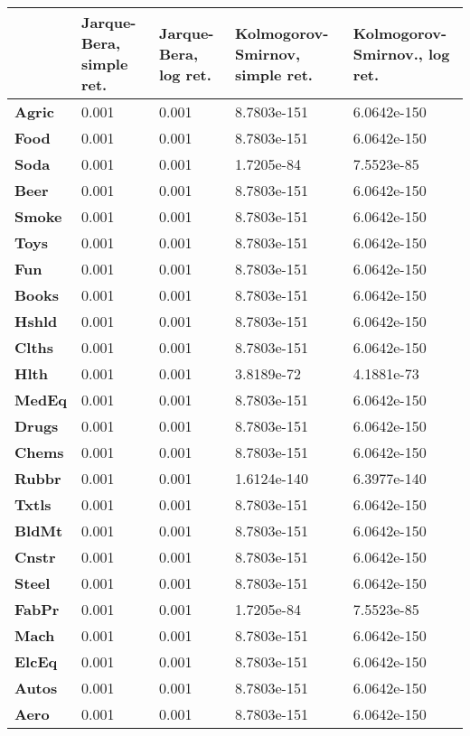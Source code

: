 \begin{tabular}{|l|l|l|l|l|}
\hline
&\textbf{Jarque-Bera, simple ret.}&\textbf{Jarque-Bera, log ret.}&\textbf{Kolmogorov-Smirnov, simple ret.}&\textbf{Kolmogorov-Smirnov., log ret.}\\\hline
\textbf{Agric}&0.001&0.001&8.7803e-151&6.0642e-150\\\hline
\textbf{Food}&0.001&0.001&8.7803e-151&6.0642e-150\\\hline
\textbf{Soda}&0.001&0.001&1.7205e-84&7.5523e-85\\\hline
\textbf{Beer}&0.001&0.001&8.7803e-151&6.0642e-150\\\hline
\textbf{Smoke}&0.001&0.001&8.7803e-151&6.0642e-150\\\hline
\textbf{Toys}&0.001&0.001&8.7803e-151&6.0642e-150\\\hline
\textbf{Fun}&0.001&0.001&8.7803e-151&6.0642e-150\\\hline
\textbf{Books}&0.001&0.001&8.7803e-151&6.0642e-150\\\hline
\textbf{Hshld}&0.001&0.001&8.7803e-151&6.0642e-150\\\hline
\textbf{Clths}&0.001&0.001&8.7803e-151&6.0642e-150\\\hline
\textbf{Hlth}&0.001&0.001&3.8189e-72&4.1881e-73\\\hline
\textbf{MedEq}&0.001&0.001&8.7803e-151&6.0642e-150\\\hline
\textbf{Drugs}&0.001&0.001&8.7803e-151&6.0642e-150\\\hline
\textbf{Chems}&0.001&0.001&8.7803e-151&6.0642e-150\\\hline
\textbf{Rubbr}&0.001&0.001&1.6124e-140&6.3977e-140\\\hline
\textbf{Txtls}&0.001&0.001&8.7803e-151&6.0642e-150\\\hline
\textbf{BldMt}&0.001&0.001&8.7803e-151&6.0642e-150\\\hline
\textbf{Cnstr}&0.001&0.001&8.7803e-151&6.0642e-150\\\hline
\textbf{Steel}&0.001&0.001&8.7803e-151&6.0642e-150\\\hline
\textbf{FabPr}&0.001&0.001&1.7205e-84&7.5523e-85\\\hline
\textbf{Mach}&0.001&0.001&8.7803e-151&6.0642e-150\\\hline
\textbf{ElcEq}&0.001&0.001&8.7803e-151&6.0642e-150\\\hline
\textbf{Autos}&0.001&0.001&8.7803e-151&6.0642e-150\\\hline
\textbf{Aero}&0.001&0.001&8.7803e-151&6.0642e-150\\\hline

\end{tabular}
